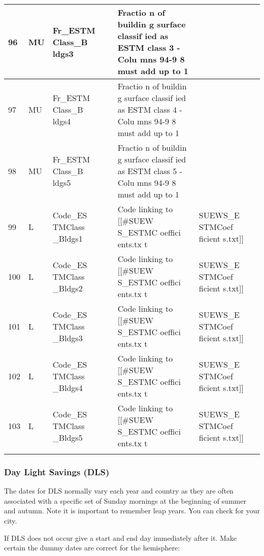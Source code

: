 \documentclass[letterpaper,10pt,english]{sphinxmanual}
\begin{document}
\begin{savenotes}
\begin{longtable}{|l|l|l|l|l|l|l|}
96
&
MU
&
Fr\_ESTM
Class\_B
ldgs3
&&
Fractio
n
of
buildin
g
surface
classif
ied
as ESTM
class 3
-  Colu
mns
94-9
8
must
add
up
to 1
&&\\
\hline
97
&
MU
&
Fr\_ESTM
Class\_B
ldgs4
&&
Fractio
n
of
buildin
g
surface
classif
ied
as ESTM
class 4
-  Colu
mns
94-9
8
must
add
up
to 1
&&\\
\hline
98
&
MU
&
Fr\_ESTM
Class\_B
ldgs5
&&
Fractio
n
of
buildin
g
surface
classif
ied
as ESTM
class 5
-  Colu
mns
94-9
8
must
add
up
to 1
&&\\
\hline
99
&
L
&
Code\_ES
TMClass
\_Bldgs1
&&
Code
linking
to
{[}{[}\#SUEW
S\_ESTMC
oeffici
ents.tx
t
&
SUEWS\_E
STMCoef
ficient
s.txt{]}{]}
&\\
\hline
100
&
L
&
Code\_ES
TMClass
\_Bldgs2
&&
Code
linking
to
{[}{[}\#SUEW
S\_ESTMC
oeffici
ents.tx
t
&
SUEWS\_E
STMCoef
ficient
s.txt{]}{]}
&\\
\hline
101
&
L
&
Code\_ES
TMClass
\_Bldgs3
&&
Code
linking
to
{[}{[}\#SUEW
S\_ESTMC
oeffici
ents.tx
t
&
SUEWS\_E
STMCoef
ficient
s.txt{]}{]}
&\\
\hline
102
&
L
&
Code\_ES
TMClass
\_Bldgs4
&&
Code
linking
to
{[}{[}\#SUEW
S\_ESTMC
oeffici
ents.tx
t
&
SUEWS\_E
STMCoef
ficient
s.txt{]}{]}
&\\
\hline
103
&
L
&
Code\_ES
TMClass
\_Bldgs5
&&
Code
linking
to
{[}{[}\#SUEW
S\_ESTMC
oeffici
ents.tx
t
&
SUEWS\_E
STMCoef
ficient
s.txt{]}{]}
&\\
\hline&&&&&&\\
\hline
\end{longtable}\sphinxatlongtableend\end{savenotes}


\subsubsection{Day Light Savings (DLS)}
\label{\detokenize{input_files/SUEWS_SiteInfo/SUEWS_SiteSelect:day-light-savings-dls}}
The dates for DLS normally vary each year and country as they are often
associated with a specific set of Sunday mornings at the beginning of
summer and autumn. Note it is important to remember leap years. You can
check  for your city.

If DLS does not occur give a start and end day immediately after it.
Make certain the dummy dates are correct for the hemisphere:

\begin{DUlineblock}{0em}
\item[] 
\item[] 
\end{DUlineblock}
\end{document}
